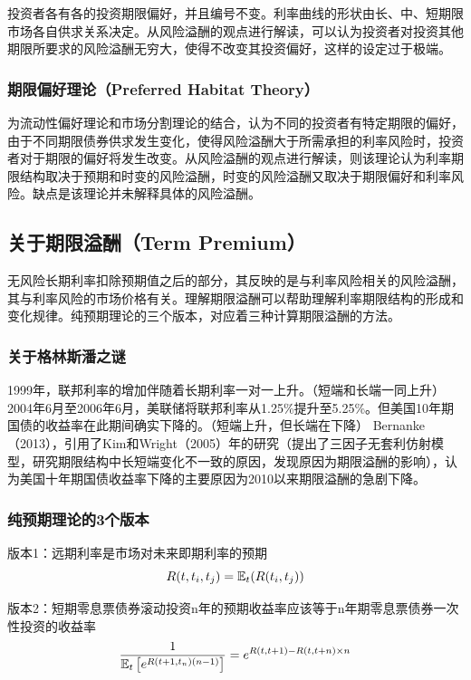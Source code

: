 \documentclass[11pt]{article}
\begin{document}
投资者各有各的投资期限偏好，并且编号不变。利率曲线的形状由长、中、短期限市场各自供求关系决定。从风险溢酬的观点进行解读，可以认为投资者对投资其他期限所要求的风险溢酬无穷大，使得不改变其投资偏好，这样的设定过于极端。

\subsubsection{期限偏好理论（Preferred Habitat Theory）}

为流动性偏好理论和市场分割理论的结合，认为不同的投资者有特定期限的偏好，由于不同期限债券供求发生变化，使得风险溢酬大于所需承担的利率风险时，投资者对于期限的偏好将发生改变。从风险溢酬的观点进行解读，则该理论认为利率期限结构取决于预期和时变的风险溢酬，时变的风险溢酬又取决于期限偏好和利率风险。缺点是该理论并未解释具体的风险溢酬。

\subsection{关于期限溢酬（Term Premium）}

无风险长期利率扣除预期值之后的部分，其反映的是与利率风险相关的风险溢酬，其与利率风险的市场价格有关。理解期限溢酬可以帮助理解利率期限结构的形成和变化规律。纯预期理论的三个版本，对应着三种计算期限溢酬的方法。

\subsubsection{关于格林斯潘之谜}

1999年，联邦利率的增加伴随着长期利率一对一上升。（短端和长端一同上升）
2004年6月至2006年6月，美联储将联邦利率从1.25\%提升至5.25\%。但美国10年期国债的收益率在此期间确实下降的。（短端上升，但长端在下降）
Bernanke（2013），引用了Kim和Wright（2005）年的研究（提出了三因子无套利仿射模型，研究期限结构中长短端变化不一致的原因，发现原因为期限溢酬的影响），认为美国十年期国债收益率下降的主要原因为2010以来期限溢酬的急剧下降。

\subsubsection{纯预期理论的3个版本}

版本1：远期利率是市场对未来即期利率的预期
\begin{equation*}
	R(t,t_i,t_j) = \mathbb{E}_t(R(t_i,t_j))
\end{equation*}

版本2：短期零息票债券滚动投资n年的预期收益率应该等于n年期零息票债券一次性投资的收益率
\begin{equation*}
	\frac{1}{\mathbb{E}_t\left[e^{R(t+1,t_n)(n-1)}\right]} = e^{R(t,t+1)-R(t,t+n)\times n}
\end{equation*}
\end{document}
